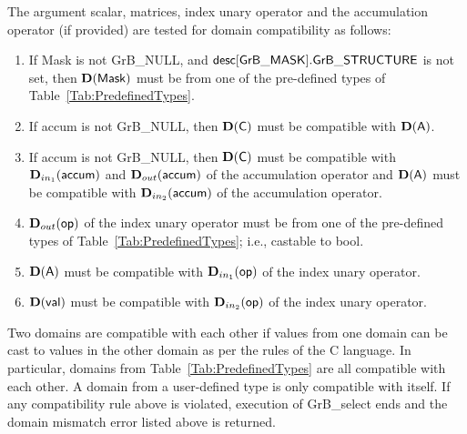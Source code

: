 {\color{red}
The argument scalar, matrices, index unary operator and the accumulation 
operator (if provided) are tested for domain compatibility as follows:
\begin{enumerate}
    \item If {\sf Mask} is not {\sf GrB\_NULL}, and ${\sf desc[GrB\_MASK].GrB\_STRUCTURE}$
    is not set, then $\bold{D}({\sf Mask})$ must be from one of the pre-defined types of 
    Table~\ref{Tab:PredefinedTypes}.

    \item If {\sf accum} is not {\sf GrB\_NULL}, then $\bold{D}({\sf C})$ must be 
	compatible with $\bold{D}({\sf A})$.

    \item If {\sf accum} is not {\sf GrB\_NULL}, then $\bold{D}({\sf C})$ must be
    compatible with $\mbox{$\mathbf{D}_{in_{1}}$}({\sf accum})$ and $\mbox{$\mathbf{D}_{out}$}({\sf accum})$ of the accumulation operator and 
    $\bold{D}({\sf A})$ must be compatible with $\mbox{$\mathbf{D}_{in_{2}}$}({\sf accum})$ of the accumulation operator.

	\item $\mbox{$\mathbf{D}_{out}$}({\sf op})$ of the index unary operator must be from one of the pre-defined types of 
    Table~\ref{Tab:PredefinedTypes}; i.e., castable to {\sf bool}.

    \item $\bold{D}({\sf A})$ must be compatible with $\mbox{$\mathbf{D}_{in_{1}}$}({\sf op})$ of the index unary operator.
    
    \item $\bold{D}({\sf val})$ must be compatible with $\mbox{$\mathbf{D}_{in_{2}}$}({\sf op})$ of the index unary operator.
\end{enumerate}
}
Two domains are compatible with each other if values from one domain can be cast 
to values in the other domain as per the rules of the C language.
In particular, domains from Table~\ref{Tab:PredefinedTypes} are all compatible 
with each other. A domain from a user-defined type is only compatible with itself.
If any compatibility rule above is violated, execution of {\sf GrB\_select} ends and 
the domain mismatch error listed above is returned.


